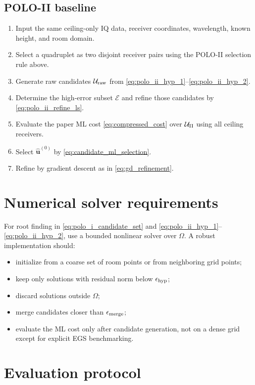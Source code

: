 \documentclass[11pt]{article}
\begin{document}
\subsection*{POLO-II baseline}
\begin{enumerate}[leftmargin=*]
    \item Input the same ceiling-only IQ data, receiver coordinates, wavelength, known height, and room domain.
    \item Select a quadruplet as two disjoint receiver pairs using the POLO-II selection rule above.
    \item Generate raw candidates $\mathcal{U}_{\rm raw}$ from \eqref{eq:polo_ii_hyp_1}--\eqref{eq:polo_ii_hyp_2}.
    \item Determine the high-error subset $\mathcal{E}$ and refine those candidates by \eqref{eq:polo_ii_refine_ls}.
    \item Evaluate the paper ML cost \eqref{eq:compressed_cost} over $\mathcal{U}_{\rm II}$ using all ceiling receivers.
    \item Select $\hat{\mathbf{u}}^{(0)}$ by \eqref{eq:candidate_ml_selection}.
    \item Refine by gradient descent as in \eqref{eq:gd_refinement}.
\end{enumerate}

\section{Numerical solver requirements}

For root finding in \eqref{eq:polo_i_candidate_set} and \eqref{eq:polo_ii_hyp_1}--\eqref{eq:polo_ii_hyp_2}, use a bounded nonlinear solver over $\Omega$. A robust implementation should:
\begin{itemize}[leftmargin=*]
    \item initialize from a coarse set of room points or from neighboring grid points;
    \item keep only solutions with residual norm below $\epsilon_{\rm hyp}$;
    \item discard solutions outside $\Omega$;
    \item merge candidates closer than $\epsilon_{\rm merge}$;
    \item evaluate the ML cost only after candidate generation, not on a dense grid except for explicit EGS benchmarking.
\end{itemize}

\section{Evaluation protocol}
\end{document}

